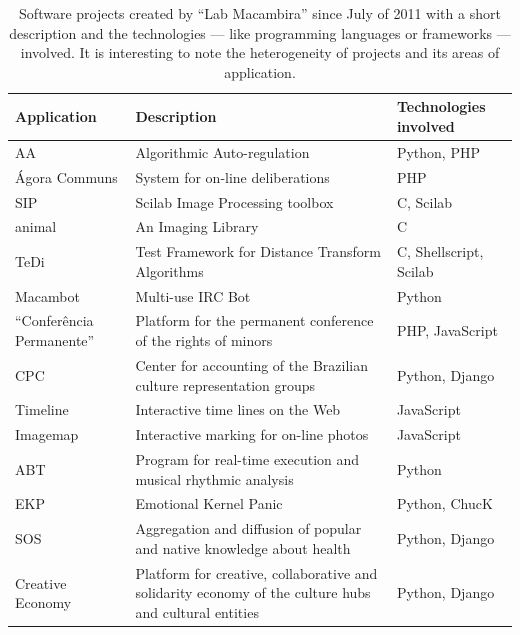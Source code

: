\documentclass[letterpaper]{article}
\begin{document}
\begin{table}
    \caption{Software projects created by ``Lab Macambira'' since July
      of 2011 with a short description and the technologies --- like
      programming languages or frameworks --- involved. It is
      interesting to note the heterogeneity of projects and its areas
      of application.}
    \begin{tabular}{|l|p{5cm}|l|}
        \hline
        Application & Description & Technologies involved \\ 
        \hline \hline
        AA            & Algorithmic Auto-regulation      & Python, PHP \\
        \hline
        \'{A}gora Communs & System for on-line deliberations & PHP \\
        \hline
        SIP           & Scilab Image Processing toolbox & C, Scilab \\
        \hline
        animal        & An Imaging Library              & C \\
        \hline
        TeDi          & Test Framework for Distance Transform
        Algorithms & C, Shellscript, Scilab \\
        \hline
        Macambot      & Multi-use IRC Bot               & Python \\
        \hline
        ``Confer\^{e}ncia Permanente'' & Platform for the permanent
        conference of the rights of minors & PHP, JavaScript \\
        \hline
        CPC           & Center for accounting of the Brazilian culture
        representation groups & Python, Django \\
        \hline
        Timeline      & Interactive time lines on the Web & JavaScript
        \\
        \hline
        Imagemap      & Interactive marking for on-line photos &
        JavaScript \\
        \hline
        ABT           & Program for real-time execution and musical
        rhythmic analysis & Python \\
        \hline
        EKP           & Emotional Kernel Panic & Python, ChucK \\
        \hline
        SOS           & Aggregation and diffusion of popular and native
        knowledge about health & Python, Django \\
        \hline
        Creative Economy & Platform for creative, collaborative and
        solidarity economy of the culture hubs and cultural entities &
        Python, Django \\

\end{tabular}
\end{table}
\end{document}
